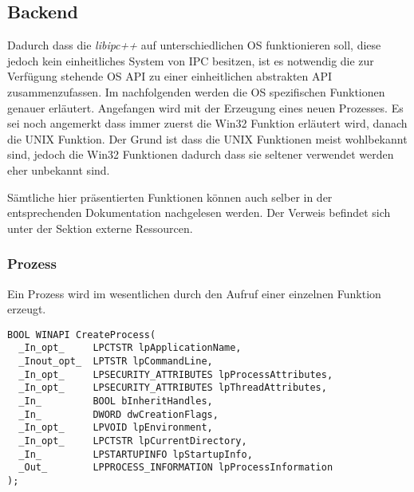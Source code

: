 \documentclass[a4paper]{book}
\begin{document}
\subsection{Backend}
Dadurch dass die \textit{libipc++} auf unterschiedlichen OS funktionieren soll, diese jedoch kein einheitliches System von IPC besitzen, ist es notwendig die zur Verfügung stehende OS API zu einer einheitlichen abstrakten API zusammenzufassen. Im nachfolgenden werden die OS spezifischen Funktionen genauer erläutert. Angefangen wird mit der Erzeugung eines neuen Prozesses. Es sei noch angemerkt dass immer zuerst die Win32 Funktion erläutert wird, danach die UNIX Funktion. Der Grund ist dass die UNIX Funktionen meist wohlbekannt sind, jedoch die Win32 Funktionen dadurch dass sie seltener verwendet werden eher unbekannt sind.\newline

\noindent Sämtliche hier präsentierten Funktionen können auch selber in der entsprechenden Dokumentation nachgelesen werden. Der Verweis befindet sich unter der Sektion externe Ressourcen.

\subsubsection{Prozess}
Ein Prozess wird im wesentlichen durch den Aufruf einer einzelnen Funktion erzeugt.

\lstset{language=[Visual]C++}
\begin{lstlisting}[caption={CreateProcess},frame=single]
BOOL WINAPI CreateProcess(
  _In_opt_     LPCTSTR lpApplicationName,
  _Inout_opt_  LPTSTR lpCommandLine,
  _In_opt_     LPSECURITY_ATTRIBUTES lpProcessAttributes,
  _In_opt_     LPSECURITY_ATTRIBUTES lpThreadAttributes,
  _In_         BOOL bInheritHandles,
  _In_         DWORD dwCreationFlags,
  _In_opt_     LPVOID lpEnvironment,
  _In_opt_     LPCTSTR lpCurrentDirectory,
  _In_         LPSTARTUPINFO lpStartupInfo,
  _Out_        LPPROCESS_INFORMATION lpProcessInformation
);
\end{lstlisting}
\end{document}
